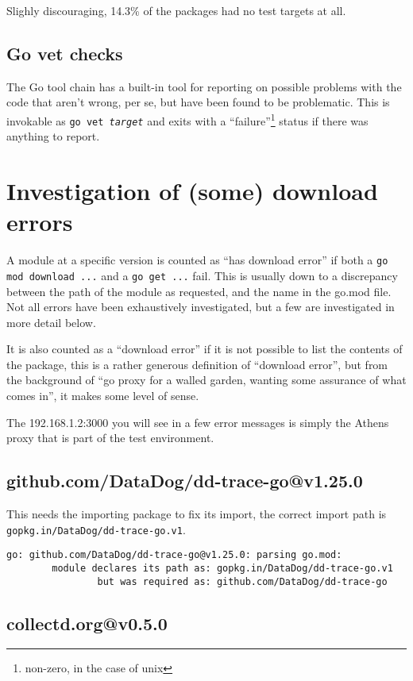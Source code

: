 \documentclass[a4paper]{paper}
\begin{document}
Slighly discouraging, 14.3\% of the packages had no test targets at all.

\subsection{Go vet checks}

The Go tool chain has a built-in tool for reporting on possible
problems with the code that aren't wrong, per se, but have been found
to be problematic. This is invokable as {\tt go vet {\it target}}
and exits with a ``failure''\footnote{non-zero, in the case of unix}
status if there was anything to report.

\section{Investigation of (some) download errors}

A module at a specific version is counted as ``has download error'' if
both a {\tt go mod download ...} and a {\tt go get ...} fail. This is
usually down to a discrepancy between the path of the module as
requested, and the name in the go.mod file. Not all errors have been
exhaustively investigated, but a few are investigated in more detail
below.

It is also counted as a ``download error'' if it is not possible to
list the contents of the package, this is a rather generous definition
of ``download error'', but from the background of ``go proxy for a
walled garden, wanting some assurance of what comes in'', it makes
some level of sense.

The 192.168.1.2:3000 you will see in a few error messages is simply
the Athens proxy that is part of the test environment.

\subsection{github.com/DataDog/dd-trace-go@v1.25.0}

This needs the importing package to fix its import, the correct import path is {\tt gopkg.in/DataDog/dd-trace-go.v1}.
\begin{verbatim}
go: github.com/DataDog/dd-trace-go@v1.25.0: parsing go.mod:
        module declares its path as: gopkg.in/DataDog/dd-trace-go.v1
                but was required as: github.com/DataDog/dd-trace-go
\end{verbatim}


\subsection{collectd.org@v0.5.0}
\end{document}
